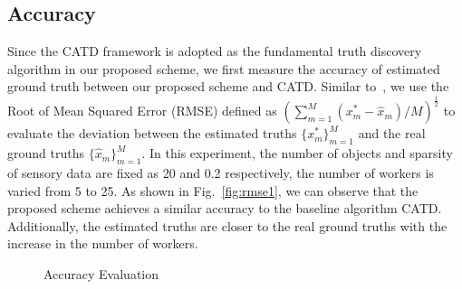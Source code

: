 \documentclass[conference]{IEEEtran}
\begin{document}
\subsection{Accuracy}
Since the CATD framework is adopted as the fundamental truth discovery algorithm in our proposed scheme, we first measure the accuracy of estimated ground truth between our proposed scheme and CATD.
Similar to~\cite{zhang_reliable_2019,xue_inpptd_2020}, we use the Root of Mean Squared Error (RMSE) defined as $(\sum_{m=1}^M (x_m^* - \hat{x}_m)/M)^{\frac{1}{2}}$ to evaluate the deviation between the estimated truths $\{x_m^*\}_{m=1}^M$ and the real ground truths $\{\hat{x}_m\}_{m=1}^M$.
In this experiment, the number of objects and sparsity of sensory data are fixed as 20 and 0.2 respectively, the number of workers is varied from 5 to 25.
As shown in Fig.~\ref{fig:rmse1}, we can observe that the proposed scheme achieves a similar accuracy to the baseline algorithm CATD.
Additionally, the estimated truths are closer to the real ground truths with the increase in the number of workers.
\begin{figure}[htbp]
  \centering 
  \caption{Accuracy Evaluation}
  \label{fig:rmse} 
\end{figure}
\end{document}
